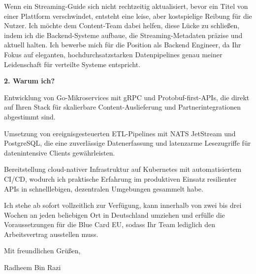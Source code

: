 \documentclass[11pt,a4paper]{coverletter}
\begin{document}
Wenn ein Streaming-Guide sich nicht rechtzeitig aktualisiert, bevor ein Titel von einer Plattform verschwindet, entsteht eine leise, aber kostspielige Reibung für die Nutzer. Ich möchte dem Content-Team dabei helfen, diese Lücke zu schließen, indem ich die Backend-Systeme aufbaue, die Streaming-Metadaten präzise und aktuell halten. Ich bewerbe mich für die Position als Backend Engineer, da Ihr Fokus auf eleganten, hochdurchsatzstarken Datenpipelines genau meiner Leidenschaft für verteilte Systeme entspricht.

\vspace{8pt}\noindent\textbf{2. Warum ich?}\par\vspace{3pt}

\bullets

  \item Entwicklung von Go-Mikroservices mit gRPC und Protobuf-first-APIs, die direkt auf Ihren Stack für skalierbare Content-Auslieferung und Partnerintegrationen abgestimmt sind.

  \item Umsetzung von ereignisgesteuerten ETL-Pipelines mit NATS JetStream und PostgreSQL, die eine zuverlässige Datenerfassung und latenzarme Lesezugriffe für datenintensive Clients gewährleisten.

  \item Bereitstellung cloud-nativer Infrastruktur auf Kubernetes mit automatisiertem CI/CD, wodurch ich praktische Erfahrung im produktiven Einsatz resilienter APIs in schnelllebigen, dezentralen Umgebungen gesammelt habe.

\bulletsend

Ich stehe ab sofort vollzeitlich zur Verfügung, kann innerhalb von zwei bis drei Wochen an jeden beliebigen Ort in Deutschland umziehen und erfülle die Voraussetzungen für die Blue Card EU, sodass Ihr Team lediglich den Arbeitsvertrag ausstellen muss.

\closing{Mit freundlichen Grüßen,}{Radheem Bin Razi}
\end{document}
